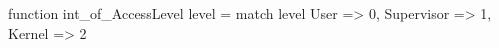 function int_of_AccessLevel level =
  match level {
    User        => 0,
    Supervisor  => 1,
    Kernel      => 2
  }

